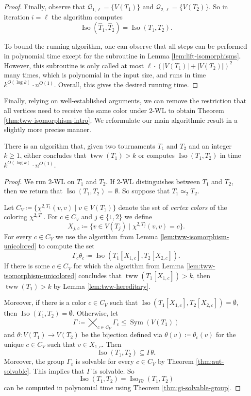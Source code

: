 \documentclass{theoretics}
\newcommand{\CQ}{{\mathcal Q}}
\newcommand{\WL}[2]{\chi^{#1,#2}}
\DeclareMathOperator{\Iso}{Iso}
\DeclareMathOperator{\Sym}{Sym}
\DeclareMathOperator{\tww}{tww}
\begin{document}
\begin{proof}
 Finally, observe that $\CQ_{1,\ell} = \{V(T_1)\}$ and $\CQ_{2,\ell} = \{V(T_2)\}$.
 So in iteration $i = \ell$ the algorithm computes
 \[\Iso(\widehat{T}_1,\widehat{T}_2) = \Iso(T_1,T_2).\]

 To bound the running algorithm, one can observe that all steps can be performed in polynomial time except for the subroutine in Lemma \ref{lem:lift-isomorphisms}.
 However, this subroutine is only called at most $\ell \cdot (|V(T_1)| + |V(T_2)|)^2$ many times, which is polynomial in the input size, and runs in time $k^{O(\log k)} \cdot n^{O(1)}$.
 Overall, this gives the desired running time.
\end{proof}

Finally, relying on well-established arguments, we can remove the restriction that all vertices need to receive the same color under $2$-WL to obtain Theorem \ref{thm:tww-isomorphism-intro}.
We reformulate our main algorithmic result in a slightly more precise manner.

\begin{theorem}
 \label{thm:tww-isomorphism}
 There is an algorithm that, given two tournaments $T_1$ and $T_2$ and an integer $k \geq 1$, either concludes that $\tww(T_1) > k$ or computes $\Iso(T_1,T_2)$ in time $k^{O(\log k)} \cdot n^{O(1)}$.
\end{theorem}

\begin{proof}
 We run $2$-WL on $T_1$ and $T_2$.
 If $2$-WL distinguishes between $T_1$ and $T_2$, then we return that $\Iso(T_1,T_2) = \emptyset$.
 So suppose that $T_1 \simeq_2 T_2$.

 Let $C_V \coloneqq \{\WL{2}{T_1}(v,v) \mid v \in V(T_1)\}$ denote the set of \emph{vertex colors} of the coloring $\WL{2}{T_1}$.
 For $c \in C_V$ and $j \in \{1,2\}$ we define
 \[X_{j,c} \coloneqq \{v \in V(T_j) \mid \WL{2}{T_j}(v,v) = c\}.\]
 For every $c \in C_V$ we use the algorithm from Lemma \ref{lem:tww-isomorphism-unicolored} to compute the set
 \[\Gamma_c\theta_c \coloneqq \Iso(T_1[X_{1,c}],T_2[X_{2,c}]).\]
 If there is some $c \in C_V$ for which the algorithm from Lemma \ref{lem:tww-isomorphism-unicolored} concludes that $\tww(T_1[X_{1,c}]) > k$, then $\tww(T_1) > k$ by Lemma \ref{lem:tww-hereditary}.

 Moreover, if there is a color $c \in C_V$ such that $\Iso(T_1[X_{1,c}],T_2[X_{2,c}]) = \emptyset$, then $\Iso(T_1,T_2) = \emptyset$.
 Otherwise, let
 \[\Gamma \coloneqq \bigtimes_{c \in C_V} \Gamma_c \leq \Sym(V(T_1))\]
 and $\theta\colon V(T_1) \to V(T_2)$ be the bijection defined via $\theta(v) \coloneqq \theta_c(v)$ for the unique $c \in C_V$ such that $v \in X_{1,c}$.
 Then
 \[\Iso(T_1,T_2) \subseteq \Gamma\theta.\]
 Moreover, the group $\Gamma_c$ is solvable for every $c \in C_V$ by Theorem \ref{thm:aut-solvable}.
 This implies that $\Gamma$ is solvable.
 So
 \[\Iso(T_1,T_2) = \Iso_{\Gamma\theta}(T_1,T_2)\]
 can be computed in polynomial time using Theorem \ref{thm:gi-solvable-group}.
\end{proof}
\end{document}
